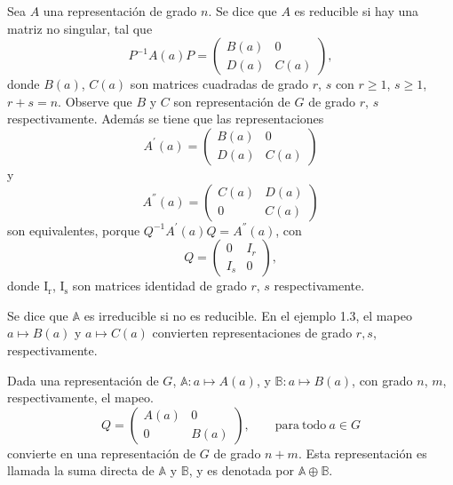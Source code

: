 \documentclass[12pt]{book}
\theoremstyle{definition}
\newcounter{in}
\begin{document}
Sea $A$ una representación de grado $n$. Se dice que $A$ es reducible
si hay una matriz no singular, tal que
\begin{equation*}
  P^{-1}A\left(a\right)P=
  \begin{pmatrix}
    B\left(a\right) & 0 \\
    D\left(a\right) & C\left(a\right)
  \end{pmatrix}, 
\end{equation*}  
donde $B\left(a\right)$, $C\left(a\right)$ son matrices cuadradas de
grado $r$, $s$ con $r \geq 1$, $s \geq 1$, $r+s=n$. Observe que $B$ y
$C$ son representación de $G$ de grado $r$, $s$
respectivamente. Además se tiene que las representaciones
\begin{equation*}
  A^{'}\left(a\right)=
  \begin{pmatrix}
    B\left(a\right) & 0 \\
    D\left(a\right) & C\left(a\right)
  \end{pmatrix}
\end{equation*}
y
\begin{equation*} 
   A^{''}\left(a\right)=
  \begin{pmatrix}
    C\left(a\right) & D\left(a\right) \\
    0 & C\left(a\right)
  \end{pmatrix}
\end{equation*}
son equivalentes, porque
$Q^{-1}A^{'}\left(a\right)Q=A^{''}\left(a\right)$, con
\begin{equation*}
  Q=
  \begin{pmatrix}
    0 & I_{r} \\ 
    I_{s} & 0
  \end{pmatrix},
\end{equation*}
donde $ \mathrm{I_{r}}$, $ \mathrm{I_{s}}$ son matrices identidad de
grado $r$, $s$ respectivamente.

Se dice que $\mathbb{A}$ es irreducible
si no es reducible. En el ejemplo 1.3, el mapeo
$a \mapsto B\left(a\right)$ y $a \mapsto C\left(a\right)$ convierten
representaciones de grado $r,s$, respectivamente.

Dada una representación de $G$,
$\mathbb{A} \colon a \mapsto A\left(a\right)$, y
$\mathbb{B} \colon a \mapsto B\left(a\right)$, con grado $n$, $m$,
respectivamente, el mapeo.
\begin{equation*}
  Q=
  \begin{pmatrix}
    A\left(a\right) & 0 \\ 
    0 & B\left(a\right)
  \end{pmatrix}, \qquad \mathrm{para\ todo\ } a \in G
\end{equation*}
convierte en una representación de $G$ de grado $n+m$. Esta
representación es llamada la suma directa de $\mathbb{A}$ y
$\mathbb{B}$, y es denotada por $\mathbb{A}\oplus\mathbb{B}$.
\end{document}
